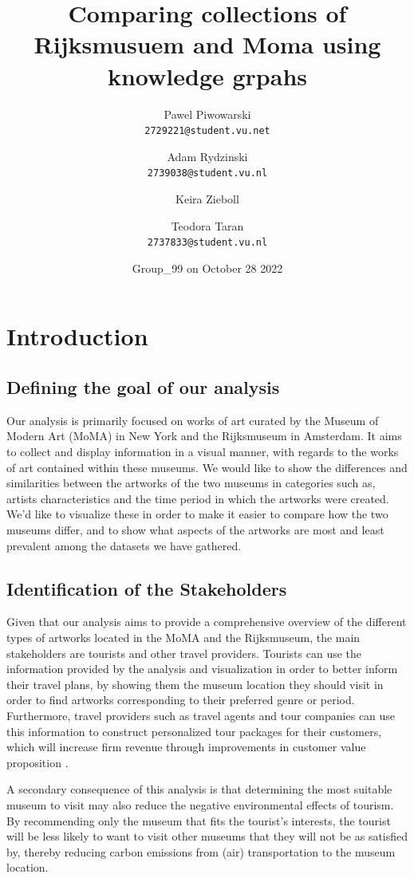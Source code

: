 \documentclass{article}
\title{Comparing collections of Rijksmusuem and Moma using knowledge grpahs}
\author{
  Pawel Piwowarski\\
  \texttt{2729221@student.vu.net}
  \and
  Adam Rydzinski\\
  \texttt{2739038@student.vu.nl}
  \and
  Keira Zieboll\\
  \texttt{}
   \and
  Teodora Taran\\
  \texttt{2737833@student.vu.nl}
}
\date{Group\_99 on October 28 2022}
\begin{document}
\maketitle


\section{Introduction}
\subsection{Defining the goal of our analysis}

Our analysis is primarily focused on works of art curated by the Museum of Modern Art (MoMA) in New York and the Rijksmuseum in Amsterdam. It aims to collect and display information in a visual manner, with regards to the works of art contained within these museums. We would like to show the differences and similarities between the artworks of the two museums in categories such as, artists characteristics and the time period in which the artworks were created. We’d like to visualize these in order to make it easier to compare how the two museums differ, and to show what aspects of the artworks are most and least prevalent among the datasets we have gathered.


\subsection{Identification of the Stakeholders}

Given that our analysis aims to provide a comprehensive overview of the different types of artworks located in the MoMA and the Rijksmuseum, the main stakeholders are tourists and other travel providers. Tourists can use the information provided by the analysis and visualization in order to better inform their travel plans, by showing them the museum location they should visit in order to find artworks corresponding to their preferred genre or period. Furthermore, travel providers such as travel agents and tour companies can use this information to construct personalized tour packages for their customers, which will increase firm revenue through improvements in customer value proposition \cite{keira}.

A secondary consequence of this analysis is that determining the most suitable museum to visit may also reduce the negative environmental effects of tourism. By recommending only the museum that fits the tourist’s interests, the tourist will be less likely to want to visit other museums that they will not be as satisfied by, thereby reducing carbon emissions from (air) transportation to the museum location.
\end{document}
